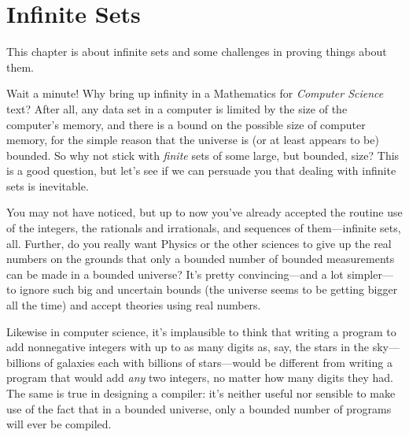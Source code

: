 \chapter{Infinite Sets}\label{infinite_chap}\label{set_theory_chap}

This chapter is about infinite sets%
%
and some challenges in proving things about them.

Wait a minute!  Why bring up infinity in a Mathematics for
\emph{Computer Science} text?  After all, any data set in a computer
is limited by the size of the computer's memory, and there is a bound
on the possible size of computer memory, for the simple reason that
the universe is (or at least appears to be) bounded.  So why not stick
with \emph{finite} sets of some large, but bounded, size?  This
is a good question, but let's see if we can persuade you that dealing
with infinite sets is inevitable.

\iffalse We've run into a lot of computer science students who wonder
why they should care about infinite sets.  They point out that
\fi

You may not have noticed, but up to now you've already accepted the
routine use of the integers, the rationals and irrationals, and
sequences of them---infinite sets, all.  Further, do you really want
Physics or the other sciences to give up the real numbers on the
grounds that only a bounded number of bounded measurements can be made
in a bounded universe?  It's pretty convincing---and a lot
simpler---to ignore such big and uncertain bounds (the universe seems
to be getting bigger all the time) and accept theories using real
numbers.

Likewise in computer science, it's implausible to think that writing a
program to add nonnegative integers with up to as many digits as, say,
the stars in the sky---billions of galaxies each with billions of
stars---would be different from writing a program that would add
\emph{any} two integers, no matter how many digits they had.  The same
is true in designing a compiler: it's neither useful nor sensible to
make use of the fact that in a bounded universe, only a bounded number
of programs will ever be compiled.

